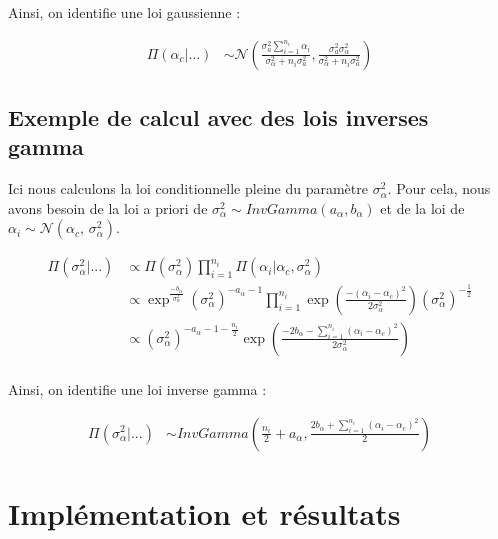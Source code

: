 \documentclass[
]{article}
\begin{document}
Ainsi, on identifie une loi gaussienne :

\begin{align*}
\Pi(\alpha_{c}|...)    &\sim \mathcal{N}\left(\frac{\sigma_{a}^{2}\sum\limits_{i=1}^{n_{i}} \alpha_{i}}{\sigma_{\alpha}^{2}+n_{i}\sigma_{a}^{2}},\frac{\sigma_{a}^{2}\sigma_{\alpha}^{2}}{\sigma_{\alpha}^{2}+n_{i}\sigma_{a}^{2}}\right)
\end{align*}

\hypertarget{exemple-de-calcul-avec-des-lois-inverses-gamma}{%
\subsection{Exemple de calcul avec des lois inverses
gamma}\label{exemple-de-calcul-avec-des-lois-inverses-gamma}}

Ici nous calculons la loi conditionnelle pleine du paramètre
\(\sigma_{\alpha}^2\). Pour cela, nous avons besoin de la loi a priori
de \(\sigma_{\alpha}^{2} \sim InvGamma(a_{\alpha},b_{\alpha})\) et de la
loi de
\(\alpha_{i} \sim \mathcal{N}(\alpha_{c},\,\sigma_{\alpha}^{2})\).

\begin{align*}
\Pi(\sigma_{\alpha}^{2}|...) &\propto \Pi(\sigma_{\alpha}^{2}) \prod_{i=1}^{n_{i}}\Pi(\alpha_{i}|\alpha_{c},\sigma_{\alpha}^{2}) \\
&\propto \exp^{\frac{-b_{\alpha}}{\sigma_{\alpha}^{2}}}(\sigma_{\alpha}^{2})^{-a_{\alpha}-1}\prod_{i=1}^{n_{i}} \exp\left(\frac{-(\alpha_{i}-\alpha_{c})^{2}}{2\sigma_{\alpha}^{2}}\right)(\sigma_{\alpha}^{2})^{-\frac{1}{2}}\\
&\propto (\sigma_{\alpha}^{2})^{-a_{\alpha}-1-\frac{n_{i}}{2}}\exp\left(\frac{-2b_{\alpha}-\sum\limits_{i=1}^{n_{i}}(\alpha_{i}-\alpha_{c})^{2}}{2\sigma_{\alpha}^{2}}\right)\\
\end{align*}

Ainsi, on identifie une loi inverse gamma :

\begin{align*}
\Pi(\sigma_{\alpha}^{2}|...) &\sim InvGamma(\frac{n_{i}}{2}+a_{\alpha},\frac{2b_{\alpha}+\sum\limits_{i=1}^{n_{i}}(\alpha_{i}-\alpha_{c})^{2}}{2})
\end{align*}

\hypertarget{impluxe9mentation-et-ruxe9sultats}{%
\section{Implémentation et
résultats}\label{impluxe9mentation-et-ruxe9sultats}}
\end{document}
